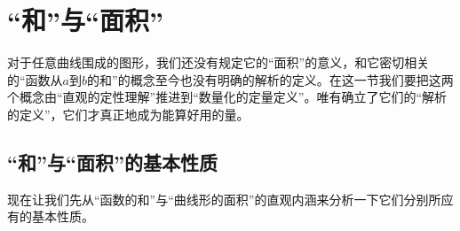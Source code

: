 \section{“和”与“面积”}
对于任意曲线围成的图形，我们还没有规定它的“面积”的意义，和它密切相关的“函数从$a$到$b$的和”的概念至今也没有明确的解析的定义。在这一节我们要把这两个概念由“直观的定性理解”推进到“数量化的定量定义”。唯有确立了它们的“解析的定义”，它们才真正地成为能算好用的量。

\subsection{“和”与“面积”的基本性质}
现在让我们先从“函数的和”与“曲线形的面积”的直观内涵来分析一下它们分别所应有的基本性质。




